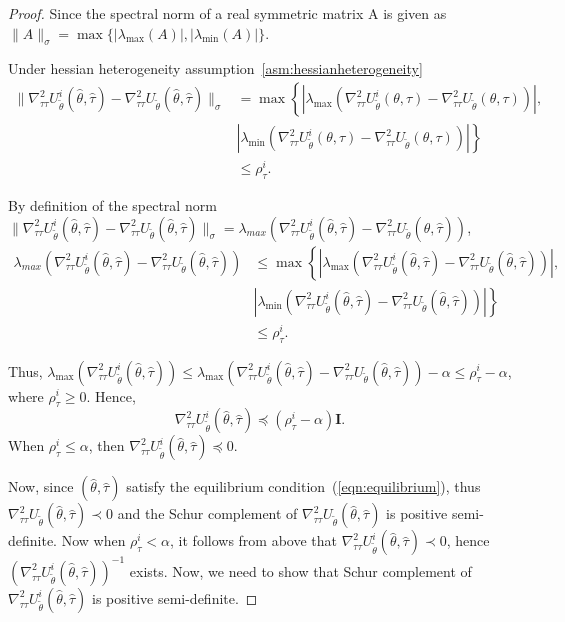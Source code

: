 \documentclass{article}
\theoremstyle{definition}
\begin{document}
\begin{proof}
Since the spectral norm of a real symmetric matrix A is given as $\lVert A\rVert_{\sigma}=\max\{\vert\lambda_{\max}(A)\vert, \vert\lambda_{\min}(A)\vert\}$.

Under hessian heterogeneity assumption~\ref{asm:hessianheterogeneity}
\begin{align*}
\|\nabla_{\tau\tau}^2U_{\tilde\theta}^i(\hat\theta,\hat\tau)-\nabla_{\tau\tau}^2U_{\tilde\theta}(\hat\theta,\hat\tau)\|_{\sigma}
&=\max\left\{\left\vert\lambda_{\max}(\nabla_{\tau\tau}^2U_{\tilde\theta}^i(\theta,\tau)-\nabla_{\tau\tau}^2U_{\tilde\theta}(\theta,\tau))\right\vert,\right.\\ &\left.\left\vert\lambda_{\min}(\nabla_{\tau\tau}^2U_{\tilde\theta}^i(\theta,\tau)-\nabla_{\tau\tau}^2U_{\tilde\theta}(\theta,\tau))\right\vert\right\}\\
&\leq \rho_{\tau}^i.
\end{align*}

By definition of the spectral norm $\|\nabla_{\tau\tau}^2U_{\tilde\theta}^i(\hat\theta,\hat\tau)-\nabla_{\tau\tau}^2U_{\tilde\theta}(\hat\theta,\hat\tau)\|_{\sigma}=\lambda_{max}(\nabla_{\tau\tau}^2U_{\tilde\theta}^i(\hat\theta,\hat\tau)-\nabla_{\tau\tau}^2U_{\tilde\theta}(\hat\theta,\hat\tau))$,
\begin{align*}
    \lambda_{max}(\nabla_{\tau\tau}^2U_{\tilde\theta}^i(\hat\theta,\hat\tau)-\nabla_{\tau\tau}^2U_{\tilde\theta}(\hat\theta,\hat\tau))
    &\leq\max\left\{\left\vert\lambda_{\max}(\nabla_{\tau\tau}^2U_{\tilde\theta}^i(\hat\theta,\hat\tau)-\nabla_{\tau\tau}^2U_{\tilde\theta}(\hat\theta,\hat\tau))\right\vert,\right.\\ &\left.\left\vert\lambda_{\min}(\nabla_{\tau\tau}^2U_{\tilde\theta}^i(\hat\theta,\hat\tau)-\nabla_{\tau\tau}^2U_{\tilde\theta}(\hat\theta,\hat\tau))\right\vert\right\}\\
&\leq \rho_{\tau}^i.
\end{align*}

Thus, $\lambda_{\max}(\nabla_{\tau\tau}^2U_{\tilde\theta}^i(\hat\theta,\hat\tau))\leq \lambda_{\max}(\nabla_{\tau\tau}^2U_{\tilde\theta}^i(\hat\theta,\hat\tau)-\nabla_{\tau\tau}^2U_{\tilde\theta}(\hat\theta,\hat\tau))-\alpha\leq \rho_{\tau}^i-\alpha$, where $\rho_{\tau}^i\geq 0$.
Hence, \[\nabla_{\tau\tau}^2U_{\tilde\theta}^i(\hat\theta,\hat\tau)\preceq (\rho_{\tau}^i-\alpha)\mathbf{I}.\]
When $\rho_{\tau}^i\le\alpha$, then $\nabla_{\tau\tau}^2U_{\tilde\theta}^i(\hat\theta,\hat\tau)\preceq 0$.

\noindent Now, since $(\hat\theta,\hat\tau)$ satisfy the equilibrium condition~(\ref{eqn:equilibrium}), thus $\nabla_{\tau\tau}^2U_{\tilde\theta}(\hat\theta,\hat\tau)\prec 0$ and the Schur complement of $\nabla_{\tau\tau}^2U_{\tilde\theta}(\hat\theta,\hat\tau)$ is positive semi-definite. 
Now when $\rho_{\tau}^i<\alpha$, it follows from above that $\nabla_{\tau\tau}^2U_{\tilde\theta}^i(\hat\theta,\hat\tau)\prec 0$, hence $\left(\nabla_{\tau\tau}^2U_{\tilde\theta}^i(\hat\theta,\hat\tau)\right)^{-1}$ exists.
Now, we need to show that Schur complement of $\nabla_{\tau\tau}^2U_{\tilde\theta}^i(\hat\theta,\hat\tau)$ is positive semi-definite.


\end{proof}
\end{document}
